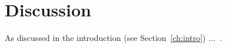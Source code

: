 \chapter{Discussion}
\label{ch:discussion}

\begin{refsection}

As discussed in the introduction (see Section~\ref{ch:intro}) ...~\cite{jupyter}.

\printbibliography[heading=subbibliography]

\end{refsection}

